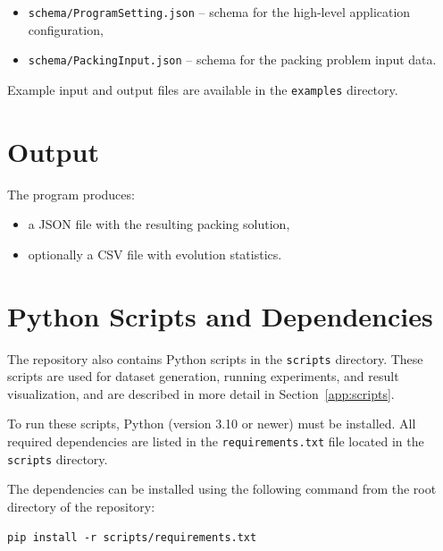 \begin{itemize}
    \item \texttt{schema/ProgramSetting.json} -- schema for the high-level application configuration,
    \item \texttt{schema/PackingInput.json} -- schema for the packing problem input data.
\end{itemize}

Example input and output files are available in the \texttt{examples} directory.

\section{Output}

The program produces:
\begin{itemize}
    \item a JSON file with the resulting packing solution,
    \item optionally a CSV file with evolution statistics.
\end{itemize}

\section{Python Scripts and Dependencies}

The repository also contains Python scripts in the \texttt{scripts} directory. 
These scripts are used for dataset generation, running experiments, and result visualization, 
and are described in more detail in Section~\ref{app:scripts}.

To run these scripts, Python (version 3.10 or newer) must be installed. 
All required dependencies are listed in the \texttt{requirements.txt} file located in the \texttt{scripts} directory.

The dependencies can be installed using the following command from the root directory of the repository:

\begin{verbatim}
pip install -r scripts/requirements.txt
\end{verbatim}